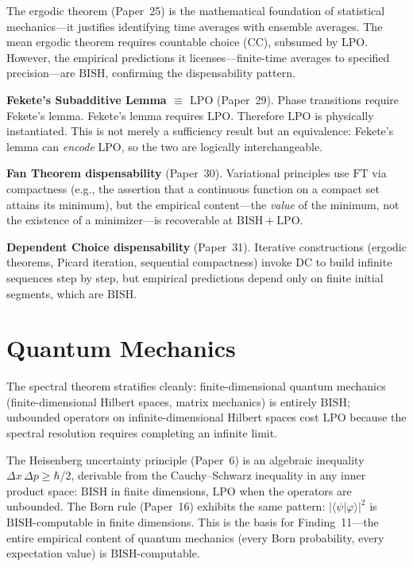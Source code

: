 \documentclass[11pt,a4paper]{report}
\theoremstyle{plain}
\theoremstyle{definition}
\theoremstyle{remark}
\newcommand{\BISH}{\mathrm{BISH}}
\newcommand{\LPO}{\mathrm{LPO}}
\newcommand{\FT}{\mathrm{FT}}
\newcommand{\DC}{\mathrm{DC}}
\newcommand{\CCax}{\mathrm{CC}}
\begin{document}
The ergodic theorem (Paper~25) is the mathematical foundation of statistical mechanics---it justifies identifying time averages with ensemble averages.  The mean ergodic theorem requires countable choice ($\CCax$), subsumed by $\LPO$.  However, the empirical predictions it licenses---finite-time averages to specified precision---are $\BISH$, confirming the dispensability pattern.

\textbf{Fekete's Subadditive Lemma $\equiv$ $\LPO$} (Paper~29). Phase transitions require Fekete's lemma. Fekete's lemma requires $\LPO$. Therefore $\LPO$ is physically instantiated.  This is not merely a sufficiency result but an equivalence: Fekete's lemma can \emph{encode} $\LPO$, so the two are logically interchangeable.

\textbf{Fan Theorem dispensability} (Paper~30). Variational principles use $\FT$ via compactness (e.g., the assertion that a continuous function on a compact set attains its minimum), but the empirical content---the \emph{value} of the minimum, not the existence of a minimizer---is recoverable at $\BISH+\LPO$.

\textbf{Dependent Choice dispensability} (Paper~31). Iterative constructions (ergodic theorems, Picard iteration, sequential compactness) invoke $\DC$ to build infinite sequences step by step, but empirical predictions depend only on finite initial segments, which are $\BISH$.

\section{Quantum Mechanics}

The spectral theorem stratifies cleanly: finite-dimensional quantum mechanics (finite-dimensional Hilbert spaces, matrix mechanics) is entirely $\BISH$; unbounded operators on infinite-dimensional Hilbert spaces cost $\LPO$ because the spectral resolution requires completing an infinite limit.

The Heisenberg uncertainty principle (Paper~6) is an algebraic inequality $\Delta x \, \Delta p \ge \hbar/2$, derivable from the Cauchy--Schwarz inequality in any inner product space: $\BISH$ in finite dimensions, $\LPO$ when the operators are unbounded.  The Born rule (Paper~16) exhibits the same pattern: $|\langle\psi|\varphi\rangle|^2$ is $\BISH$-computable in finite dimensions.  This is the basis for Finding~11---the entire empirical content of quantum mechanics (every Born probability, every expectation value) is $\BISH$-computable.
\end{document}
